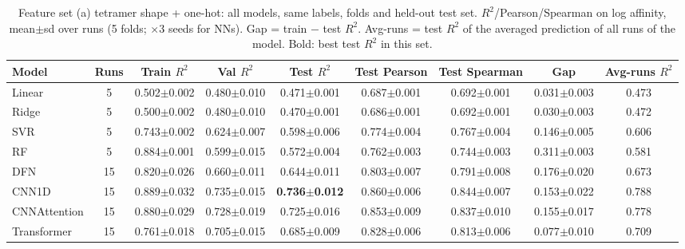 \begin{table}[H]\centering\scriptsize\setlength{\tabcolsep}{3pt}
\caption{Feature set (a) tetramer shape + one-hot: all models, same labels, folds and held-out test set. $R^2$/Pearson/Spearman on log affinity, mean$\pm$sd over runs (5 folds; $\times$3 seeds for NNs). Gap = train $-$ test $R^2$. Avg-runs = test $R^2$ of the averaged prediction of all runs of the model. Bold: best test $R^2$ in this set.}
\begin{tabular}{lcccccccc}\toprule
Model & Runs & Train $R^2$ & Val $R^2$ & Test $R^2$ & Test Pearson & Test Spearman & Gap & Avg-runs $R^2$\\\midrule
Linear & 5 & 0.502$\pm$0.002 & 0.480$\pm$0.010 & 0.471$\pm$0.001 & 0.687$\pm$0.001 & 0.692$\pm$0.001 & 0.031$\pm$0.003 & 0.473 \\
Ridge & 5 & 0.500$\pm$0.002 & 0.480$\pm$0.010 & 0.470$\pm$0.001 & 0.686$\pm$0.001 & 0.692$\pm$0.001 & 0.030$\pm$0.003 & 0.472 \\
SVR & 5 & 0.743$\pm$0.002 & 0.624$\pm$0.007 & 0.598$\pm$0.006 & 0.774$\pm$0.004 & 0.767$\pm$0.004 & 0.146$\pm$0.005 & 0.606 \\
RF & 5 & 0.884$\pm$0.001 & 0.599$\pm$0.015 & 0.572$\pm$0.004 & 0.762$\pm$0.003 & 0.744$\pm$0.003 & 0.311$\pm$0.003 & 0.581 \\
DFN & 15 & 0.820$\pm$0.026 & 0.660$\pm$0.011 & 0.644$\pm$0.011 & 0.803$\pm$0.007 & 0.791$\pm$0.008 & 0.176$\pm$0.020 & 0.673 \\
CNN1D & 15 & 0.889$\pm$0.032 & 0.735$\pm$0.015 & \textbf{0.736$\pm$0.012} & 0.860$\pm$0.006 & 0.844$\pm$0.007 & 0.153$\pm$0.022 & 0.788 \\
CNNAttention & 15 & 0.880$\pm$0.029 & 0.728$\pm$0.019 & 0.725$\pm$0.016 & 0.853$\pm$0.009 & 0.837$\pm$0.010 & 0.155$\pm$0.017 & 0.778 \\
Transformer & 15 & 0.761$\pm$0.018 & 0.705$\pm$0.015 & 0.685$\pm$0.009 & 0.828$\pm$0.006 & 0.813$\pm$0.006 & 0.077$\pm$0.010 & 0.709 \\
\bottomrule\end{tabular}\label{tab:fs_tetramer}\end{table}

